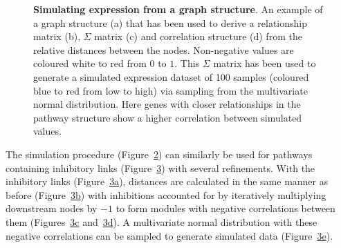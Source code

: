 \documentclass[]{article}
\begin{document}
\begin{figure}
{}

\caption{\textbf{Simulating expression from a graph structure}. An example of a graph structure (a) that has been used to derive a relationship matrix (b), $\Sigma$  matrix (c) and correlation structure (d) from the relative distances between the nodes. Non-negative values are coloured white to red from $0$ to $1$. This $\Sigma$ matrix has been used to generate a simulated expression dataset of 100 samples (coloured blue to red from low to high) via sampling from the multivariate normal distribution. Here genes with closer relationships in the pathway structure show a higher correlation between simulated values.}\label{fig:simulation_activating}
\end{figure}

The simulation procedure
(Figure~\protect\hyperlink{fig:simulation_activating}{2}) can similarly
be used for pathways containing inhibitory links
(Figure~\protect\hyperlink{fig:simulation_inhibiting}{3}) with several
refinements. With the inhibitory links
(Figure~\protect\hyperlink{fig:simulation_inhibiting:first}{3a}),
distances are calculated in the same manner as before
(Figure~\protect\hyperlink{fig:simulation_inhibiting:second}{3b}) with
inhibitions accounted for by iteratively multiplying downstream nodes by
\(-1\) to form modules with negative correlations between them
(Figures~\protect\hyperlink{fig:simulation_inhibiting:third}{3c}
and~\protect\hyperlink{fig:simulation_inhibiting:fifth}{3d}). A
multivariate normal distribution with these negative correlations can be
sampled to generate simulated data
(Figure~\protect\hyperlink{fig:simulation_inhibiting:fourth}{3e}).
\end{document}
